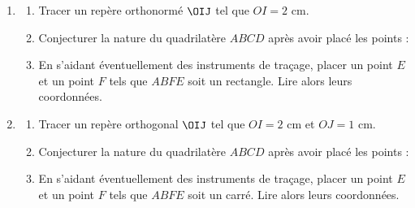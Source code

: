 \begin{exo}
	\nline

	\begin{enumerate}
		\item \begin{enumerate}
			      \item Tracer un repère orthonormé $\OIJ$ tel que $OI = 2\text{ cm}$.
			      \item Conjecturer la nature du quadrilatère $ABCD$ après avoir placé les points : 
			      \item En s'aidant éventuellement des instruments de traçage, placer un point $E$ et un point $F$ tels que $ABFE$ soit un rectangle. Lire alors leurs coordonnées.
		      \end{enumerate}

		\item \begin{enumerate}
			      \item Tracer un repère orthogonal $\OIJ$ tel que $OI = 2\text{ cm}$ et $OJ = 1\text{ cm}$.
			      \item Conjecturer la nature du quadrilatère $ABCD$ après avoir placé les points : 
			      \item En s'aidant éventuellement des instruments de traçage, placer un point $E$ et un point $F$ tels que $ABFE$ soit un carré. Lire alors leurs coordonnées.
		      \end{enumerate}
	\end{enumerate}
\end{exo}
